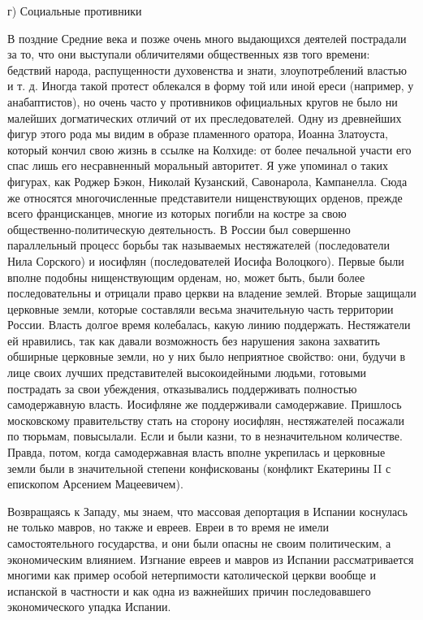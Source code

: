 г) Социальные противники

В поздние Средние века и позже очень много выдающихся деятелей
пострадали за то, что они выступали обличителями общественных язв
того времени: бедствий народа, распущенности духовенства и знати,
злоупотреблений властью и т. д. Иногда такой протест облекался в форму
той или иной ереси (например, у анабаптистов), но очень часто у
противников официальных кругов не было ни малейших догматических
отличий от их преследователей. Одну из древнейших фигур этого рода мы
видим в образе пламенного оратора, Иоанна Златоуста, который кончил
свою жизнь в ссылке на Колхиде: от более печальной участи его спас
лишь его несравненный моральный авторитет. Я уже упоминал о таких
фигурах, как Роджер Бэкон, Николай Кузанский, Савонарола, Кампанелла.
Сюда же относятся многочисленные представители нищенствующих орденов,
прежде всего францисканцев, многие из которых погибли на костре за
свою общественно-политическую деятельность. В России был совершенно
параллельный процесс борьбы так называемых нестяжателей (последователи
Нила Сорского) и иосифлян (последователей Иосифа Волоцкого). Первые
были вполне подобны нищенствующим орденам, но, может быть, были более
последовательны и отрицали право церкви на владение землей. Вторые
защищали церковные земли, которые составляли весьма значительную
часть территории России. Власть долгое время колебалась, какую линию
поддержать. Нестяжатели ей нравились, так как давали возможность без
нарушения закона захватить обширные церковные земли, но у них было
неприятное свойство: они, будучи в лице своих лучших представителей
высокоидейными людьми, готовыми пострадать за свои убеждения,
отказывались поддерживать полностью самодержавную власть. Иосифляне же
поддерживали самодержавие. Пришлось московскому правительству стать на
сторону иосифлян, нестяжателей посажали по тюрьмам, повысылали. Если и
были казни, то в незначительном количестве. Правда, потом, когда
самодержавная власть вполне укрепилась и церковные земли были в
значительной степени конфискованы (конфликт Екатерины II с епископом
Арсением Мацеевичем).

Возвращаясь к Западу, мы знаем, что массовая депортация в Испании коснулась не
только мавров, но также и евреев. Евреи в то время не имели
самостоятельного государства, и они были опасны не своим политическим, а
экономическим влиянием. Изгнание евреев и мавров из Испании рассматривается
многими как пример особой нетерпимости католической церкви вообще и
испанской в частности и как одна из важнейших причин последовавшего
экономического упадка Испании.

